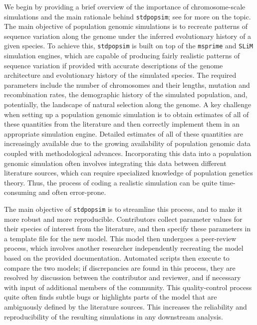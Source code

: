 \documentclass[hidelinks]{article}
\newcommand{\stdpopsim}{\texttt{stdpopsim}\xspace}
\begin{document}
We begin by providing a brief overview of the importance of chromosome-scale simulations and the main rationale behind \stdpopsim;
see \citet{Adrion2020} for more on the topic.
The main objective of population genomic simulations is to recreate 
patterns of sequence variation along the genome under 
the inferred evolutionary history of a given species.
To achieve this, \stdpopsim is built on top of the
\texttt{msprime} \citep{Kelleher2016,Nelson2020,Baumdicker2022}
and \texttt{SLiM} \citep{Haller2019} simulation engines,
which are capable of producing fairly realistic patterns of sequence variation
if provided with accurate descriptions of the genome architecture
and evolutionary history of the simulated species.
The required parameters include the number of chromosomes and their lengths,
mutation and recombination rates, the demographic history of the simulated population,
and, potentially, the landscape of natural selection along the genome.
A key challenge when setting up a population genomic simulation is to
obtain estimates of all of these quantities from the literature
and then correctly implement them in an appropriate simulation engine.
Detailed estimates of all of these quantities are increasingly available
due to the growing availability of population genomic data
coupled with methodological advances. Incorporating this data
into a population genomic simulation often involves 
integrating this data between different literature sources, which can
require specialized knowledge of population genetics theory.
Thus, the process of coding a realistic simulation can be quite time-consuming and often error-prone.

The main objective of \stdpopsim is to streamline this process,
and to make it more robust and more reproducible.
Contributors collect parameter values for their species of interest from the literature,
and then specify these parameters in a template file for the new model.
This model then undergoes a peer-review process,
which involves another researcher independently recreating the model based on the provided documentation.
Automated scripts then execute to compare the two models;
if discrepancies are found in this process, they are resolved by discussion between the contributor and reviewer,
and if necessary with input of additional members of the community.
This quality-control process quite often finds subtle bugs \citep[e.g., as in][]{Ragsdale2020}
or highlights parts of the model that are ambiguously defined by the literature sources.
This increases the reliability and reproducibility of the resulting simulations in any downstream analysis.
\end{document}

